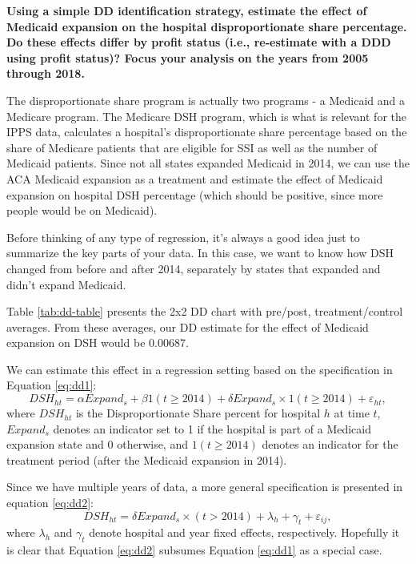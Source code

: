 \documentclass[
  12pt,
]{article}
\begin{document}
\textbf{Using a simple DD identification strategy, estimate the effect of Medicaid expansion on the hospital disproportionate share percentage. Do these effects differ by profit status (i.e., re-estimate with a DDD using profit status)? Focus your analysis on the years from 2005 through 2018.}

The disproportionate share program is actually two programs - a Medicaid and a Medicare program. The Medicare DSH program, which is what is relevant for the IPPS data, calculates a hospital's disproportionate share percentage based on the share of Medicare patients that are eligible for SSI as well as the number of Medicaid patients. Since not all states expanded Medicaid in 2014, we can use the ACA Medicaid expansion as a treatment and estimate the effect of Medicaid expansion on hospital DSH percentage (which should be positive, since more people would be on Medicaid).

Before thinking of any type of regression, it's always a good idea just to summarize the key parts of your data. In this case, we want to know how DSH changed from before and after 2014, separately by states that expanded and didn't expand Medicaid.

Table \ref{tab:dd-table} presents the 2x2 DD chart with pre/post, treatment/control averages. From these averages, our DD estimate for the effect of Medicaid expansion on DSH would be 0.00687.

We can estimate this effect in a regression setting based on the specification in Equation \eqref{eq:dd1}:
\begin{equation}
DSH_{ht} = \alpha Expand_{s} + \beta 1(t\geq 2014) + \delta Expand_{s} \times 1(t\geq 2014) + \varepsilon_{ht}, \label{eq:dd1}
\end{equation}
where \(DSH_{ht}\) is the Disproportionate Share percent for hospital \(h\) at time \(t\), \(Expand_{s}\) denotes an indicator set to 1 if the hospital is part of a Medicaid expansion state and 0 otherwise, and \(1(t\geq 2014)\) denotes an indicator for the treatment period (after the Medicaid expansion in 2014).

Since we have multiple years of data, a more general specification is presented in equation \eqref{eq:dd2}:
\begin{equation}
DSH_{ht} = \delta Expand_{s} \times (t>2014) + \lambda_{h} + \gamma_{t} + \varepsilon_{ij}, \label{eq:dd2}
\end{equation}
where \(\lambda_{h}\) and \(\gamma_{t}\) denote hospital and year fixed effects, respectively. Hopefully it is clear that Equation \eqref{eq:dd2} subsumes Equation \eqref{eq:dd1} as a special case.
\end{document}
